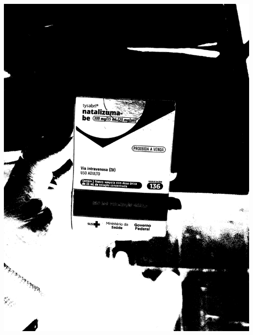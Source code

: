 \begin{frame}
\begin{columns}
\begin{column}{0.24\textwidth}
			\includegraphics[height=0.35\textheight]{../pictures/tysabri_cmyk_k_only_thresh.jpg}
			\\\vspace{\floatsep}

\end{column}
\end{columns}
\end{frame}
